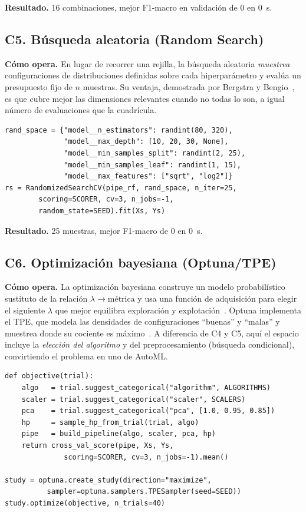 \documentclass[11pt,a4paper,twocolumn]{article}
\providecommand{\GridCV}{0}\providecommand{\GridTime}{0}\providecommand{\GridEvals}{16}
\providecommand{\RandCV}{0}\providecommand{\RandTime}{0}\providecommand{\RandEvals}{25}
\begin{document}
\noindent\textbf{Resultado.} \GridEvals{} combinaciones, mejor F1-macro en validación de \GridCV{} en
\GridTime{}~s.

\subsection{C5. Búsqueda aleatoria (Random Search)}
\textbf{Cómo opera.} En lugar de recorrer una rejilla, la búsqueda aleatoria \emph{muestrea} configuraciones
de distribuciones definidas sobre cada hiperparámetro y evalúa un presupuesto fijo de $n$ muestras. Su
ventaja, demostrada por Bergstra y Bengio~\cite{bergstra2012}, es que cubre mejor las dimensiones relevantes
cuando no todas lo son, a igual número de evaluaciones que la cuadrícula.

\begin{lstlisting}[caption={C5 -- Random Search sobre distribuciones de hiperparámetros}]
rand_space = {"model__n_estimators": randint(80, 320),
              "model__max_depth": [10, 20, 30, None],
              "model__min_samples_split": randint(2, 25),
              "model__min_samples_leaf": randint(1, 15),
              "model__max_features": ["sqrt", "log2"]}
rs = RandomizedSearchCV(pipe_rf, rand_space, n_iter=25,
        scoring=SCORER, cv=3, n_jobs=-1,
        random_state=SEED).fit(Xs, Ys)
\end{lstlisting}

\noindent\textbf{Resultado.} \RandEvals{} muestras, mejor F1-macro de \RandCV{} en \RandTime{}~s.

\subsection{C6. Optimización bayesiana (Optuna/TPE)}
\textbf{Cómo opera.} La optimización bayesiana construye un modelo probabilístico sustituto de la relación
$\lambda\!\to\!\text{métrica}$ y usa una función de adquisición para elegir el siguiente $\lambda$ que mejor
equilibra exploración y explotación~\cite{shahriari2016}. Optuna implementa el TPE, que modela las
densidades de configuraciones ``buenas'' y ``malas'' y muestrea donde su cociente es máximo~\cite{akiba2019}.
A diferencia de C4 y C5, aquí el espacio incluye la \emph{elección del algoritmo} y del preprocesamiento
(búsqueda condicional), convirtiendo el problema en uno de AutoML.

\begin{lstlisting}[caption={C6 -- Objetivo Optuna sobre el espacio AutoML condicional}]
def objective(trial):
    algo   = trial.suggest_categorical("algorithm", ALGORITHMS)
    scaler = trial.suggest_categorical("scaler", SCALERS)
    pca    = trial.suggest_categorical("pca", [1.0, 0.95, 0.85])
    hp     = sample_hp_from_trial(trial, algo)
    pipe   = build_pipeline(algo, scaler, pca, hp)
    return cross_val_score(pipe, Xs, Ys,
              scoring=SCORER, cv=3, n_jobs=-1).mean()

study = optuna.create_study(direction="maximize",
          sampler=optuna.samplers.TPESampler(seed=SEED))
study.optimize(objective, n_trials=40)
\end{lstlisting}
\end{document}
